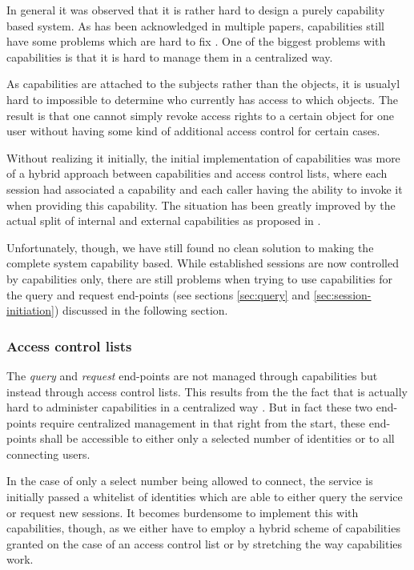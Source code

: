 \bigskip

In general it was observed that it is rather hard to design a purely capability based system.
As has been acknowledged in multiple papers, capabilities still have some problems which are hard to fix \cite{gong1989secure,shapiro1999eros}.
One of the biggest problems with capabilities is that it is hard to manage them in a centralized way.

As capabilities are attached to the subjects rather than the objects, it is usualyl hard to impossible to determine who currently has access to which objects.
The result is that one cannot simply revoke access rights to a certain object for one user without having some kind of additional access control for certain cases.

Without realizing it initially, the initial implementation of capabilities was more of a hybrid approach between capabilities and access control lists, where each session had associated a capability and each caller having the ability to invoke it when providing this capability.
The situation has been greatly improved by the actual split of internal and external capabilities as proposed in \cite{gong1989secure}.

Unfortunately, though, we have still found no clean solution to making the complete system capability based.
While established sessions are now controlled by capabilities only, there are still problems when trying to use capabilities for the query and request end-points (see sections \ref{sec:query} and \ref{sec:session-initiation}) discussed in the following section.

\subsubsection{Access control lists}

The \emph{query} and \emph{request} end-points are not managed through capabilities but instead through access control lists.
This results from the the fact that is actually hard to administer capabilities in a centralized way \cite{shapiro1999eros}.
But in fact these two end-points require centralized management in that right from the start, these end-points shall be accessible to either only a selected number of identities or to all connecting users.

In the case of only a select number being allowed to connect, the service is initially passed a whitelist of identities which are able to either query the service or request new sessions.
It becomes burdensome to implement this with capabilities, though, as we either have to employ a hybrid scheme of capabilities granted on the case of an access control list or by stretching the way capabilities work.

